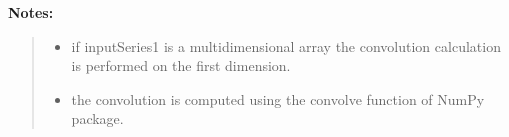 \begin{boxedminipage}{\funcwidth}
\textbf{Notes:}
\begin{quote}
  \begin{itemize}

  \item
    \setlength{\parskip}{0.6ex}
if {\textbar}inputSeries1{\textbar} is a multidimensional array the 
convolution calculation is performed on the first dimension.



  \item the convolution is computed using the convolve function of NumPy package.



\end{itemize}

\end{quote}

    \end{boxedminipage}

    \label{nMOLDYN:Core:Mathematics:FFT}

    \vspace{0.5ex}

